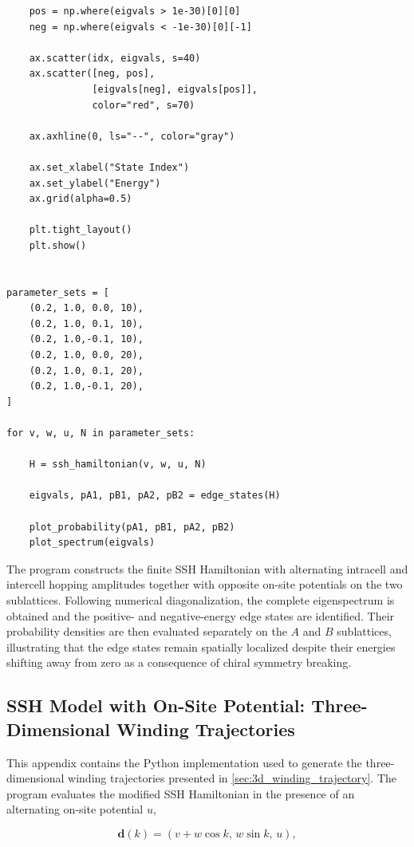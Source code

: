 \documentclass[11pt, a4paper]{article}
\begin{document}
\begin{lstlisting}
    pos = np.where(eigvals > 1e-30)[0][0]
    neg = np.where(eigvals < -1e-30)[0][-1]

    ax.scatter(idx, eigvals, s=40)
    ax.scatter([neg, pos],
               [eigvals[neg], eigvals[pos]],
               color="red", s=70)

    ax.axhline(0, ls="--", color="gray")

    ax.set_xlabel("State Index")
    ax.set_ylabel("Energy")
    ax.grid(alpha=0.5)

    plt.tight_layout()
    plt.show()


parameter_sets = [
    (0.2, 1.0, 0.0, 10),
    (0.2, 1.0, 0.1, 10),
    (0.2, 1.0,-0.1, 10),
    (0.2, 1.0, 0.0, 20),
    (0.2, 1.0, 0.1, 20),
    (0.2, 1.0,-0.1, 20),
]

for v, w, u, N in parameter_sets:

    H = ssh_hamiltonian(v, w, u, N)

    eigvals, pA1, pB1, pA2, pB2 = edge_states(H)

    plot_probability(pA1, pB1, pA2, pB2)
    plot_spectrum(eigvals)
\end{lstlisting}


The program constructs the finite SSH Hamiltonian with alternating intracell and intercell hopping amplitudes together with opposite on-site potentials on the two sublattices. Following numerical diagonalization, the complete eigenspectrum is obtained and the positive- and negative-energy edge states are identified. Their probability densities are then evaluated separately on the \(A\) and \(B\) sublattices, illustrating that the edge states remain spatially localized despite their energies shifting away from zero as a consequence of chiral symmetry breaking.

\subsection{SSH Model with On-Site Potential: Three-Dimensional Winding Trajectories}

This appendix contains the Python implementation used to generate the three-dimensional winding trajectories presented in \cref{sec:3d_winding_trajectory}. The program evaluates the modified SSH Hamiltonian in the presence of an alternating on-site potential \(u\),

\begin{equation}
\mathbf d(k)=
\left(
v+w\cos k,\,
w\sin k,\,
u
\right),
\end{equation}
\end{document}
